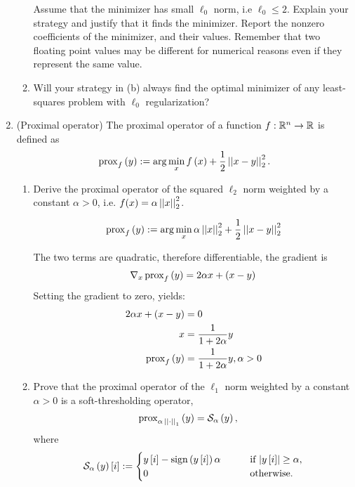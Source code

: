 \documentclass[12pt,twoside]{article}
\begin{document}
\begin{enumerate}
\begin{enumerate}
    Assume that the minimizer has small $\ell_0$ norm, i.e $\ell_0 \leq 2$. Explain your strategy and justify that it finds the minimizer.  
    Report the nonzero coefficients of the minimizer, and
    their values.  Remember that two floating point values may be different for numerical reasons even if they represent the same value.
    \item Will your strategy in (b) always find the optimal minimizer of any least-squares problem with $\ell_0$ regularization?
  \end{enumerate}
  
 \newpage
 \item (Proximal operator) The proximal operator of a function $f: \mathbb{R}^n \rightarrow \mathbb{R}$ is defined as
\begin{align}
\operatorname{prox}_{f}\left( y \right) := \arg \min_{x} f\left( x \right)+ \frac{1}{2} \left|\left| x-y \right|\right| _{2}^2.
\end{align}
  \begin{enumerate}
  \item Derive the proximal operator of the squared $\ell_2$ norm weighted by a constant $\alpha > 0$, i.e. $f(x)=\alpha \left|\left| x \right|\right| _{2}^2$.

\begin{align*}
\operatorname{prox}_{f}\left( y \right) := \arg \min_{x}  \alpha \left|\left| x \right|\right| _{2}^2 + \frac{1}{2} \left|\left| x-y \right|\right| _{2}^2
\end{align*}

The two terms are quadratic, therefore differentiable, the gradient is 
$$
	\nabla_x \operatorname{prox}_{f}\left( y \right) = 2 \alpha x + (x-y)
$$
 Setting the gradient to zero, yields:
\begin{align*}
	2 \alpha x + (x-y)			&= 	0 \\
		x 					&= \frac{1} {1+2 \alpha} y \\
		\operatorname{prox}_{f}\left( y \right) 		&=	 \frac{1} {1+2 \alpha} y, \alpha > 0 \\
\end{align*}
 
  \item Prove that the proximal operator of the $\ell_1$ norm weighted by a constant $\alpha > 0$ is a soft-thresholding operator,
\begin{align}
\operatorname{prox}_{\alpha \, \left|\left|  \cdot  \right|\right| _{1}}\left(  y  \right) & = \mathcal{ S }_{\alpha}\left( y \right),
\end{align}
where 
\begin{align}
\mathcal{ S }_{\alpha}\left( y \right)[i] := 
\begin{cases}
y\,[i] - \operatorname{sign}\left( y\,[i] \right) \alpha  \qquad & \text{if $\lvert y\,[i]\rvert \geq \alpha$}, \\
0 \quad & \text{otherwise}.
\end{cases}
\end{align}\\


\end{enumerate}
\end{enumerate}
\end{document}
